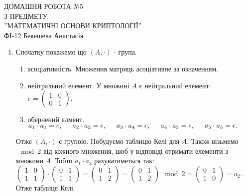 \documentclass[a4paper,12pt]{article}
\newcommand\tab[1][0.5cm]{\hspace*{#1}}
\begin{document}
	\begin{justify}
		\thispagestyle{empty}\setlength{\parindent}{0pt}
 		\vspace*{\fill}
  		\begin{center}
  			\noindent\makebox[\linewidth]{\rule{\paperwidth}{0.4pt}}
   			\LARGE{\bigbreak ДОМАШНЯ РОБОТА №5\\З ПРЕДМЕТУ\\''МАТЕМАТИЧНІ ОСНОВИ КРИПТОЛОГІЇ''\\\bigbreak} 
   			ФІ-12 Бекешева Анастасія 
   			\noindent\makebox[\linewidth]{\rule{\paperwidth}{0.4pt}}
  		\end{center}
 		\vspace*{\fill}\newpage
 		\begin{enumerate}
 			\item Спочатку покажемо що $(A, \cdot)$ - група. 
 				\begin{enumerate} 
 					\item асоціативність. Множення матриць асоціативне за означенням.
 					\item нейтральний елемент. У множині $A$ є нейтральний елемент: $e=\begin{pmatrix}
 						1&0\\0&1
 					\end{pmatrix}$.
 					\item обернений елмент. $a_1\cdot a_1=e,\tab a_2\cdot a_2=e,\tab a_3\cdot a_4=e,\tab a_4\cdot a_3=e,\tab a_5\cdot a_5=e.$
 				\end{enumerate}
 				Отже $(A,\cdot)$ є групою. 
 				Побудуємо таблицю Келі для $A$. Також візьмемо $\mod 2$ від кожного множення, шоб у відповіді отримати елементи з множини $A$. Тобто $a_1\cdot a_3$ рахуватиметься так: $\begin{pmatrix}
 				1&0\\1&1
 			\end{pmatrix}\cdot\begin{pmatrix}
 				0&1\\1&1
 			\end{pmatrix}=\begin{pmatrix}
 				0&1\\1&2
 			\end{pmatrix}=\begin{pmatrix}
 				0&1\\1&2
 			\end{pmatrix}\mod 2=\begin{pmatrix}
 				0&1\\1&0
 			\end{pmatrix}=a_2$. Отже таблиця Келі:

\end{enumerate}
\end{justify}
\end{document}
